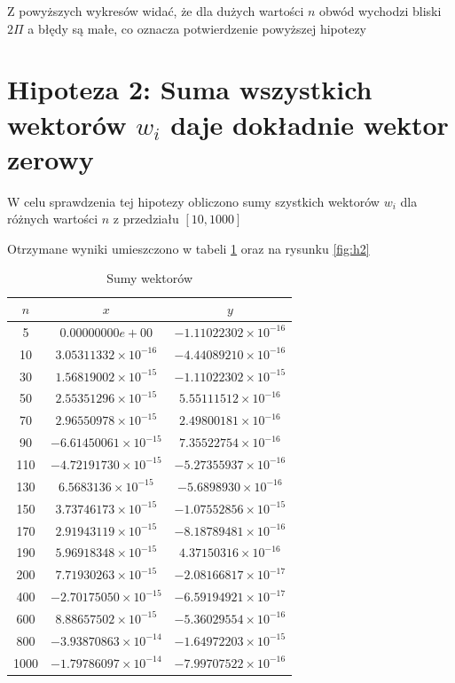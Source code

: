 \documentclass[12pt,a4paper]{article}
\begin{document}
Z powyższych wykresów widać, że dla dużych wartości $n$ obwód wychodzi bliski $2\Pi$ a błędy są małe, co oznacza potwierdzenie powyższej hipotezy



\newpage

\section{Hipoteza 2: Suma wszystkich wektorów $w_{i}$ daje dokładnie wektor zerowy}

W celu sprawdzenia tej hipotezy obliczono sumy szystkich wektorów $w_{i}$ dla różnych wartości $n$ z przedziału $[10, 1000]$

Otrzymane wyniki umieszczono w tabeli \ref{tab:h2} oraz na rysunku \ref{fig:h2}

\begin{table}[htbp]
    \centering
    \begin{tabular}{| c | c | c |}
    \hline
    {$n$} & {$x$} & {$y$} \\
    \hline
    5 &  $0.00000000e+00$ & $-1.11022302 \times 10^{-16}$ \\
    10 & $3.05311332 \times 10^{-16}$ & $-4.44089210 \times 10^{-16}$ \\
    30 & $1.56819002 \times 10^{-15}$ & $-1.11022302 \times 10^{-15}$ \\
    50 & $2.55351296 \times 10^{-15}$ & $5.55111512 \times 10^{-16}$ \\
    70 & $2.96550978 \times 10^{-15}$ & $2.49800181 \times 10^{-16}$ \\
    90 & $-6.61450061 \times 10^{-15}$ & $7.35522754 \times 10^{-16}$ \\
    110 & $-4.72191730 \times 10^{-15}$ & $-5.27355937 \times 10^{-16}$ \\
    130 & $6.5683136 \times 10^{-15}$ & $-5.6898930 \times 10^{-16}$ \\
    150 & $3.73746173 \times 10^{-15}$ & $-1.07552856 \times 10^{-15}$ \\
    170 & $2.91943119 \times 10^{-15}$ & $-8.18789481 \times 10^{-16}$ \\
    190 & $5.96918348 \times 10^{-15}$ & $4.37150316 \times 10^{-16}$ \\
    200 & $7.71930263 \times 10^{-15}$ & $-2.08166817 \times 10^{-17}$ \\
    400 & $-2.70175050 \times 10^{-15}$ & $-6.59194921 \times 10^{-17}$ \\
    600 & $8.88657502 \times 10^{-15}$ & $-5.36029554 \times 10^{-16}$ \\
    800 & $-3.93870863 \times 10^{-14}$ & $-1.64972203 \times 10^{-15}$ \\
    1000 & $-1.79786097 \times 10^{-14}$ & $-7.99707522 \times 10^{-16}$ \\
    \hline
    \end{tabular}
    \caption{Sumy wektorów}
    \label{tab:h2}
\end{table}
\end{document}
